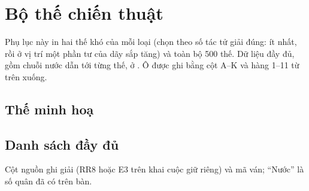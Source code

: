\chapter{Bộ thế chiến thuật}
\label{app:chien-thuat}
Phụ lục này in hai thế khó của mỗi loại (chọn theo số tác tử giải đúng: ít nhất, rồi ở vị trí một phần tư của dãy sắp
tăng) và toàn bộ 500 thế. Dữ liệu đầy đủ, gồm chuỗi nước dẫn tới từng thế, ở
. Ô được ghi bằng cột A--K và hàng 1--11 từ trên xuống.

\section{Thế minh hoạ}






\section{Danh sách đầy đủ}
Cột nguồn ghi giải (RR8 hoặc E3 trên khai cuộc giữ riêng) và mã ván; ``Nước'' là số quân đã có trên bàn.

